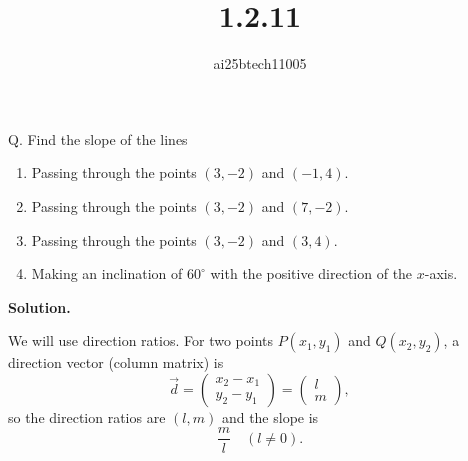 \documentclass[journal]{IEEEtran}
\begin{document}

\vspace{3cm}

\title{1.2.11}
\author{ai25btech11005}
 \maketitle
{\let\newpage\relax\maketitle}

\renewcommand{\thefigure}{\theenumi}
\renewcommand{\thetable}{\theenumi}
\setlength{\intextsep}{10pt} %


\renewcommand{\thetable}{\theenumi}
Q. Find the slope of the lines
\begin{enumerate}
  \item Passing through the points \((3,-2)\) and \((-1,4)\).
  \item Passing through the points \((3,-2)\) and \((7,-2)\).
  \item Passing through the points \((3,-2)\) and \((3,4)\).
  \item Making an inclination of \(60^\circ\) with the positive direction of the \(x\)-axis.
\end{enumerate}

\textbf{Solution.}  

We will use direction ratios. For two points \(P(x_1,y_1)\) and \(Q(x_2,y_2)\), a direction vector (column matrix) is
\[
\vec{d}=\begin{pmatrix}x_2-x_1\\[4pt]y_2-y_1\end{pmatrix}=\begin{pmatrix}l\\[4pt]m\end{pmatrix},
\]
so the direction ratios are \((l,m)\) and the slope is 
\[
\frac{m}{l}\quad (l\neq0).
\]
\end{document}

